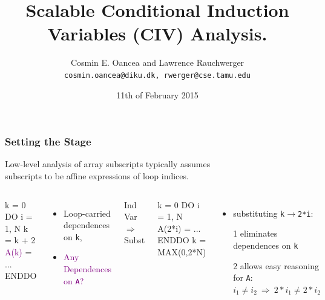 \documentclass{beamer}
\title[]{Scalable Conditional Induction Variables (CIV) Analysis.}
\author[]{Cosmin E. Oancea and Lawrence Rauchwerger\\{\tt cosmin.oancea@diku.dk, rwerger@cse.tamu.edu}}
\institute{University of Copenhagen and Texas A\&M University}
\date[11/02/2015]{11th of February 2015}
\newcommand{\purple}[1]{\textcolor{Purple}{{#1}}}
\newcommand{\emp}[1]{\textcolor{DikuRed}{ #1}}
\newcommand{\emphh}[1]{\textcolor{CosGreen}{ #1}}
\begin{document}
\titleslide



\begin{frame}[fragile,t]
  \frametitle{Setting the Stage}

Low-level analysis of array subscripts typically assumes\\
subscripts to be affine expressions of loop indices.
\medskip

\begin{columns}
\begin{colorcode}[fontsize=\small]
k = 0
DO i = 1, N
  \emp{k} = \emp{k} + 2
  \purple{A(k)} = ...
ENDDO
\end{colorcode}

\begin{itemize}
    \item \emp{Loop-carried dependences on {\tt k}},
    \item \purple{Any Dependences on {\tt A}?}
\end{itemize}

\pause
Ind\\
Var\\
$\Longrightarrow$\\
Subst
\pause
\begin{colorcode}[fontsize=\small]
k = 0
DO i = 1, N
  \emphh{A(2*i)} = ...
ENDDO
k = MAX(0,2*N)
\end{colorcode}

\begin{itemize}
    \item substituting {\tt k}$\rightarrow${\tt 2*i}:
    \item[1] eliminates \emp{dependences on {\tt k}}
    \item[2] allows easy reasoning for {\tt A}: 
                \emphh{$i_1 \neq i_2 \ \Rightarrow \ 2*i_1 \neq 2*i_2$}
\end{itemize}
\end{columns}

\end{frame}
\end{document}
